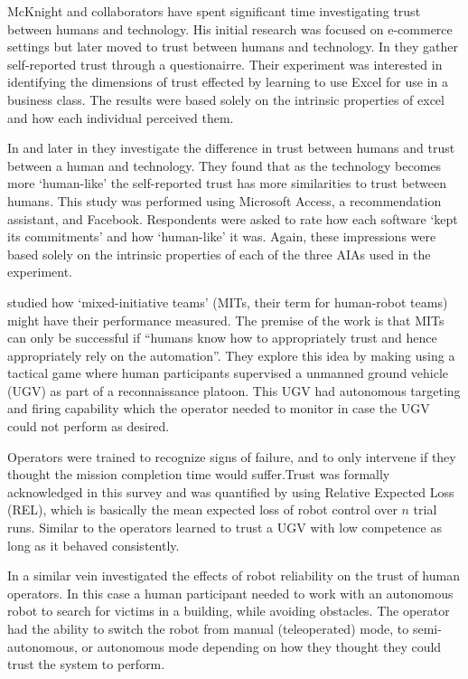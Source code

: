 McKnight and collaborators have spent significant time investigating trust between humans and technology. His initial research was focused on e-commerce settings but later moved to trust between humans and technology. In \cite{Mcknight2011-gv} they gather self-reported trust through a questionairre. Their experiment was interested in identifying the dimensions of trust effected by learning to use Excel for use in a business class. The results were based solely on the intrinsic properties of excel and how each individual perceived them.

In \cite{Lankton2008-ct} and later in \cite{Tripp2011-cq} they investigate the difference in trust between humans and trust between a human and technology. They found that as the technology becomes more `human-like' the self-reported trust has more similarities to trust between humans. This study was performed using Microsoft Access, a recommendation assistant, and Facebook. Respondents were asked to rate how each software `kept its commitments' and how `human-like' it was. Again, these impressions were based solely on the intrinsic properties of each of the three AIAs used in the experiment.

\citet{Freedy2007-sg} studied how `mixed-initiative teams' (MITs, their term for human-robot teams) might have their performance measured. The premise of the work is that MITs can only be successful if ``humans know how to appropriately trust and hence appropriately rely on the automation''. They explore this idea by making using a tactical game where human participants supervised a unmanned ground vehicle (UGV) as part of a reconnaissance platoon. This UGV had autonomous targeting and firing capability which the operator needed to monitor in case the UGV could not perform as desired.

Operators were trained to recognize signs of failure, and to only intervene if they thought the mission completion time would suffer.Trust was formally acknowledged in this survey and was quantified by using Relative Expected Loss (REL), which is basically the mean expected loss of robot control over $n$ trial runs. Similar to \cite{Muir1996-gt} the operators learned to trust a UGV with low competence as long as it behaved consistently.

In a similar vein \citet{Desai2012-rc} investigated the effects of robot reliability on the trust of human operators. In this case a human participant needed to work with an autonomous robot to search for victims in a building, while avoiding obstacles. The operator had the ability to switch the robot from manual (teleoperated) mode, to semi-autonomous, or autonomous mode depending on how they thought they could trust the system to perform.

